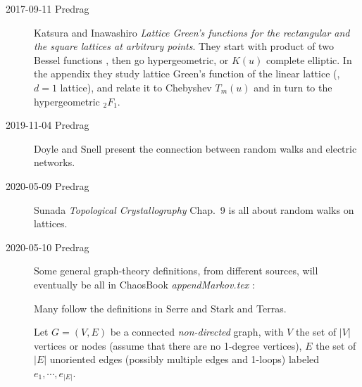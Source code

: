 \begin{description}


\item[2017-09-11 Predrag]
Katsura and Inawashiro {\em Lattice {Green's} functions for
the rectangular and the square lattices at arbitrary points}. They start
with product of two Bessel functions , then go
hypergeometric, or $K(u)$ complete elliptic. In the appendix they study
lattice Green's function of the linear lattice (\ie, $d=1$ lattice), and
relate it to Chebyshev $T_m(u)$ and in turn to the hypergeometric ${}_2
F{}_1$.

\item[2019-11-04 Predrag]
Doyle and Snell  present the connection
between random walks and electric networks.


\item[2020-05-09 Predrag]
Sunada {\em Topological Crystallography}
 Chap.~9 is all about random walks on lattices.

\item[2020-05-10 Predrag]
                                                        \toCB
Some general graph-theory definitions, from different sources,
will eventually be all in ChaosBook \emph{appendMarkov.tex} :

Many follow the definitions in
Serre and Stark and Terras.

Let $G=(V,E)$ be a connected {\it non-directed} graph, with $V$ the set
of $|V|$ vertices or nodes (assume that there are no 1-degree vertices),
$E$ the set of $|E|$ unoriented edges (possibly multiple edges and
1-loops) labeled $e_{1}, \cdots, e_{|E|}$.


\end{description}
